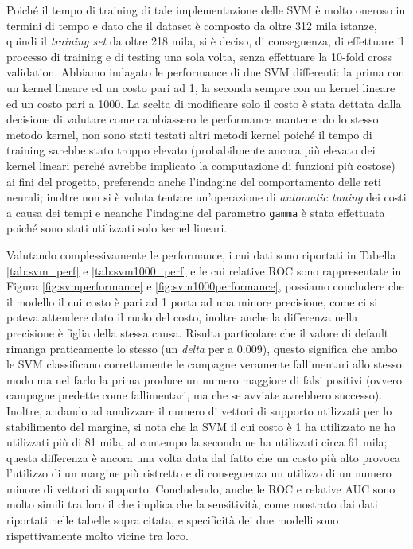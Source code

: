 Poiché il tempo di training di tale implementazione delle SVM è molto oneroso in termini di tempo e dato che il dataset è composto da oltre 312 mila istanze, quindi il \textit{training set} da oltre 218 mila, si è deciso, di conseguenza, di effettuare il processo di training e di testing una sola volta, senza effettuare la 10-fold cross validation.
Abbiamo indagato le performance di due SVM differenti: la prima con un kernel lineare ed un costo pari ad 1, la seconda sempre con un kernel lineare ed un costo pari a 1000. 
La scelta di modificare solo il costo è stata dettata dalla decisione di valutare come cambiassero le performance mantenendo lo stesso metodo kernel, non sono stati testati altri metodi kernel poiché il tempo di training sarebbe stato troppo elevato (probabilmente ancora più elevato dei kernel lineari perché avrebbe implicato la computazione di funzioni più costose) ai fini del progetto, preferendo anche l'indagine del comportamento delle reti neurali; inoltre non si è voluta tentare un'operazione di \textit{automatic tuning} dei costi a causa dei tempi e neanche l'indagine del parametro \texttt{gamma} è stata effettuata poiché sono stati utilizzati solo kernel lineari.

Valutando complessivamente le performance, i cui dati sono riportati in Tabella \ref{tab:svm_perf} e \ref{tab:svm1000_perf} e le cui relative ROC sono rappresentate in Figura \ref{fig:svmperformance} e \ref{fig:svm1000performance}, possiamo concludere che il modello il cui costo è pari ad 1 porta ad una minore precisione, come ci si poteva attendere dato il ruolo del costo, inoltre anche la differenza nella precisione è figlia della stessa causa.
Risulta particolare che il valore di default rimanga praticamente lo stesso (un \textit{delta} per a 0.009), questo significa che ambo le SVM classificano correttamente le campagne veramente fallimentari allo stesso modo ma nel farlo la prima produce un numero maggiore di falsi positivi (ovvero campagne predette come fallimentari, ma che se avviate avrebbero successo). 
Inoltre, andando ad analizzare il numero di vettori di supporto utilizzati per lo stabilimento del margine, si nota che la SVM il cui costo è 1 ha utilizzato ne ha utilizzati più di 81 mila, al contempo la seconda ne ha utilizzati circa 61 mila; questa differenza è ancora una volta data dal fatto che un costo più alto provoca l'utilizzo di un margine più ristretto e di conseguenza un utilizzo di un numero minore di vettori di supporto.
Concludendo, anche le ROC e relative AUC sono molto simili tra loro il che implica che la sensitività, come mostrato dai dati riportati nelle tabelle sopra citata, e specificità dei due modelli sono rispettivamente molto vicine tra loro.

